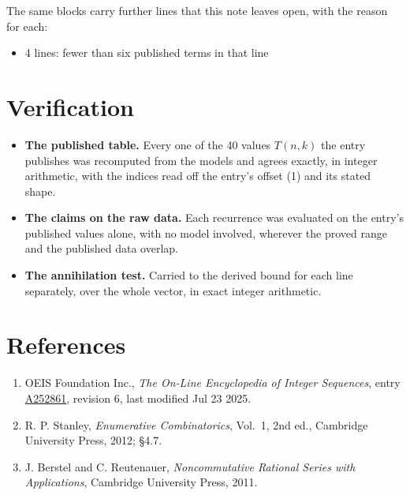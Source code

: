 \documentclass[11pt]{article}
\theoremstyle{definition}
\begin{document}
The same blocks carry further lines that this note leaves open, with the reason for each:

\begin{itemize}

\item 4 lines: fewer than six published terms in that line

\end{itemize}

\section{Verification}

\begin{itemize}

\item {\bfseries The published table.} Every one of the 40 values $T(n,k)$ the entry publishes was recomputed from the models and agrees exactly, in integer arithmetic, with the indices read off the entry's offset (1) and its stated shape.

\item {\bfseries The claims on the raw data.} Each recurrence was evaluated on the entry's published values alone, with no model involved, wherever the proved range and the published data overlap.

\item {\bfseries The annihilation test.} Carried to the derived bound for each line separately, over the whole vector, in exact integer arithmetic.

\end{itemize}

\section{References}

\begin{enumerate}

\item OEIS Foundation Inc., \emph{The On-Line Encyclopedia of Integer Sequences}, entry \href{https://oeis.org/A252861}{A252861}, revision 6, last modified Jul 23 2025.

\item R. P. Stanley, \emph{Enumerative Combinatorics}, Vol.~1, 2nd ed., Cambridge University Press, 2012; \S4.7.

\item J. Berstel and C. Reutenauer, \emph{Noncommutative Rational Series with Applications}, Cambridge University Press, 2011.

\end{enumerate}
\end{document}
